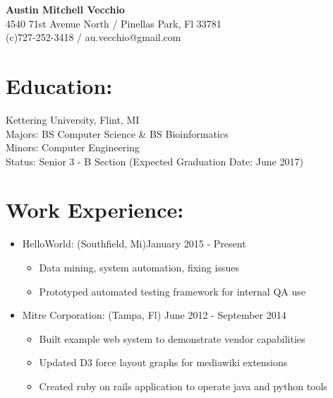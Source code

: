 \documentclass{res}
\begin{document}
\begin{center}
\LARGE{\textbf{Austin Mitchell Vecchio}}\\
\normalsize{
4540 71st Avenue North / Pinellas Park, Fl 33781\\
(c)727-252-3418 / au.vecchio@gmail.com
}
\end{center}

\section{Education:}
Kettering University, Flint, MI\\
Majors: BS Computer Science \& BS Bioinformatics\\
Minors: Computer Engineering\\
Status: Senior 3 - B Section (Expected Graduation Date: June 2017)


\section{Work Experience:}
\begin{itemize}[leftmargin=*]
\item HelloWorld: (Southfield, Mi)\hfill January 2015 - Present
\begin{itemize}[label=$\circ$]
\item Data mining, system automation, fixing issues
\item Prototyped automated testing framework for internal QA use
\end{itemize}
\item Mitre Corporation: (Tampa, Fl) \hfill June 2012 - September 2014
\begin{itemize}[label=$\circ$]
\item Built example web system to demonstrate vendor capabilities
\item Updated D3 force layout graphs for mediawiki extensions
\item Created ruby on rails application to operate java and python tools
\end{itemize}
\end{itemize}
\end{document}
